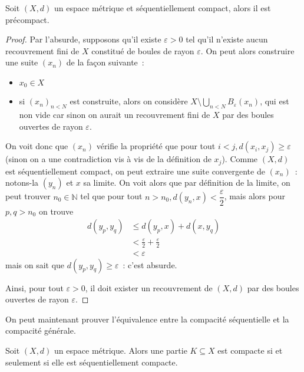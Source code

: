 \begin{lemma}\label{lem.precomp}
  Soit $(X,d)$ un espace métrique et séquentiellement compact, alors il est
  précompact.
\end{lemma}

\begin{proof}
  Par l'absurde, supposons qu'il existe $\varepsilon > 0$ tel qu'il n'existe
  aucun recouvrement fini de $X$ constitué de boules de rayon $\varepsilon$.
  On peut alors construire une suite $(x_n)$ de la façon suivante~:
  \begin{itemize}
  \item $x_0 \in X$
  \item si $(x_n)_{n < N}$ est construite, alors on considère
    $\displaystyle X\setminus \bigcup_{n < N} B_\varepsilon(x_n)$, qui est non
    vide car sinon on aurait un recouvrement fini de $X$ par des boules ouvertes
    de rayon $\varepsilon$.
  \end{itemize}
  On voit donc que $(x_n)$ vérifie la propriété que pour tout
  $i < j, d(x_i,x_j) \geq \varepsilon$ (sinon on a une contradiction vis à vis
  de la définition de $x_j$). Comme $(X,d)$ est séquentiellement compact, on
  peut extraire une suite convergente de $(x_n)$~: notons-la $(y_n)$ et $x$ sa
  limite. On voit alors que par définition de la limite, on peut trouver
  $n_0\in\mathbb N$ tel que pour tout
  $n > n_0, d(y_n,x) < \dfrac{\varepsilon}{2}$, mais alors pour $p,q > n_0$ on
  trouve
  \begin{align*}
    d(y_p,y_q) &\leq d(y_p,x) + d(x,y_q)\\
    &< \frac\varepsilon 2 + \frac\varepsilon 2\\
    &< \varepsilon
  \end{align*}
  mais on sait que $d(y_p,y_q) \geq \varepsilon$~: c'est absurde.

  Ainsi, pour tout $\varepsilon > 0$, il doit exister un recouvrement de $(X,d)$
  par des boules ouvertes de rayon $\varepsilon$.
\end{proof}

On peut maintenant prouver l'équivalence entre la compacité séquentielle et la
compacité générale.

\begin{theorem}
  Soit $(X,d)$ un espace métrique. Alors une partie $K\subseteq X$ est compacte
  si et seulement si elle est séquentiellement compacte.
\end{theorem}

